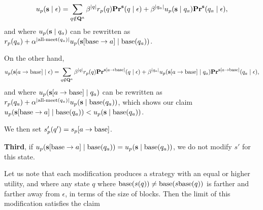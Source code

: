 $$u_p(\mathbf{s} \mid \epsilon) = \sum_{q \notin \mathbf{Q}^a} \beta^{|q|} r_p(q) \mathbf{Pr}^{\mathbf{s}}(q \mid \epsilon) + 
\beta^{|q_a|} u_p(\mathbf{s} \mid q_a) \mathbf{Pr}^{\mathbf{s}}(q_a \mid \epsilon), $$
and where $u_p(\mathbf{s} \mid q_a)$ can be rewritten as $r_p(q_a) + \alpha^{|\text{\rm all-meet}(q_a)|}u_p(\mathbf{s}[\text{\rm base} \rightarrow a] \mid \text{\rm base}(q_a))$. 

On the other hand, 
$$u_p(\mathbf{s}[a \rightarrow \text{\rm base}] \mid \epsilon) = \sum_{q \notin \mathbf{Q}^a} \beta^{|q|} r_p(q) \mathbf{Pr}^{\mathbf{s}[a \rightarrow \text{\rm base}]}(q \mid \epsilon) + 
\beta^{|q_a|} u_p(\mathbf{s}[a \rightarrow \text{\rm base}] \mid q_a) \mathbf{Pr}^{\mathbf{s}[a \rightarrow \text{\rm base}]}(q_a \mid \epsilon), $$
and where $u_p(\mathbf{s}[a \rightarrow \text{\rm base}] \mid q_a)$ can be rewritten as $r_p(q_a) + \alpha^{|\text{\rm all-meet}(q_a)|}u_p(\mathbf{s} \mid \text{\rm base}(q_a))$, 
which shows our claim  $u_p(\mathbf{s}[\text{\rm base} \rightarrow a] \mid \text{\rm base}(q_a)) < u_p(\mathbf{s} \mid \text{\rm base}(q_a))$. 

We then set $s'_p(q') = s_p[a \rightarrow \text{\rm base}]$. 

\textbf{Third}, if $u_p(\mathbf{s}[\text{\rm base} \rightarrow a] \mid \text{\rm base}(q_a)) = u_p(\mathbf{s} \mid \text{\rm base}(q_a))$, we do not modify $s'$ for this state. 

Let us note that each modification produces a strategy with an equal or higher utility, and where any state $q$ where 
$\text{\rm base}(s(q)) \neq \text{\rm base}(s\text{\rm base}(q))$ is farther and farther away from $\epsilon$, in terms of the size of blocks. 
Then the limit of this modification satisfies the claim 







